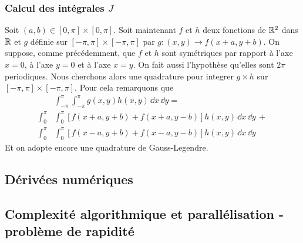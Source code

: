 \documentclass[10pt]{article}
\begin{document}
\begin{multicols}{2}
\vspace*{11pt}




\subsubsection{Calcul des intégrales $J$}

Soit $(a,b) \in [0,\pi]\times [0,\pi]$. Soit maintenant $f$ et $h$ deux fonctions de $\mathbb{R}^2$ dans $\mathbb{R}$ et  $g$ définie sur  $[-\pi, \pi] \times [-\pi, \pi]$ par $g : (x,y) \rightarrow f(x+a, y+b)$. On suppose, comme précédemment, que $f$ et $h$ sont symétriques par rapport à l'axe $x=0$, à l'axe $y=0$ et à l'axe $x=y$. On fait aussi l'hypothèse qu'elles sont $2\pi$ periodiques. Nous cherchons alors une quadrature pour integrer $g\times h$ sur $[-\pi, \pi] \times [-\pi, \pi]$. Pour cela remarquons que
\begin{equation}
\begin{split}
 & \int_{-\pi}^{\pi} \int_{-\pi}^{\pi} g(x,y) h(x,y) \,  \dd x \, \dd y  = \\
 \int_{0}^{\pi} & \int_{0}^{\pi} [f(x+a, y+b) + f(x+a, y-b)] h(x,y) \, \dd x \, \dd y \, + \\ 
\int_{0}^{\pi} & \int_{0}^{\pi} [f(x-a, y+b) + f(x-a, y-b)] h(x,y)  \, \dd x \, \dd y 
\end{split}
\end{equation}
Et on adopte encore une quadrature de Gauss-Legendre.





\subsection{Dérivées numériques}


\subsection{Complexité algorithmique et parallélisation - problème de rapidité} 


\end{multicols}
\end{document}
